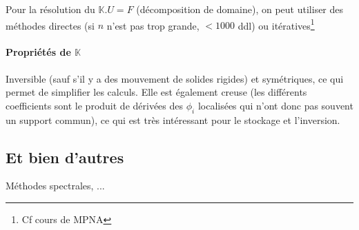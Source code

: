 \documentclass{article}
\begin{document}
Pour la résolution du $\mathbb{K}.U=F$ (décomposition de domaine), on peut utiliser des méthodes directes (si $n$ n'est pas trop grande, $< 1000$ ddl) ou itératives\footnote{Cf cours de MPNA}

\paragraph{Propriétés de $\mathbb{K}$} Inversible (sauf s'il y a des mouvement de solides rigides) et symétriques, ce qui permet de simplifier les calculs. Elle est également creuse (les différents coefficients sont le produit de dérivées des $\phi_i$ localisées qui n'ont donc pas souvent un support commun), ce qui est très intéressant pour le stockage et l'inversion.

\subsection{Et bien d'autres}
Méthodes spectrales, ...
\end{document}

